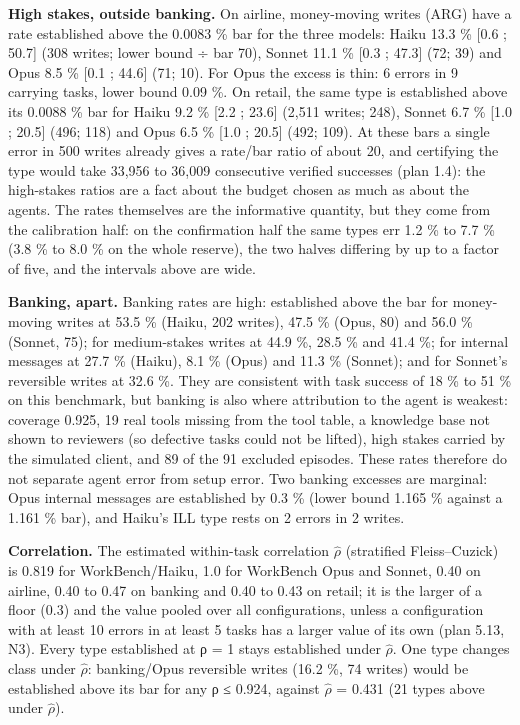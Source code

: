 \textbf{High stakes, outside banking.} On airline, money-moving writes (ARG) have a rate established above the 0.0083 \% bar for the three models: Haiku 13.3 \% {[}0.6 ; 50.7{]} (308 writes; lower bound ÷ bar 70), Sonnet 11.1 \% {[}0.3 ; 47.3{]} (72; 39) and Opus 8.5 \% {[}0.1 ; 44.6{]} (71; 10). For Opus the excess is thin: 6 errors in 9 carrying tasks, lower bound 0.09 \%. On retail, the same type is established above its 0.0088 \% bar for Haiku 9.2 \% {[}2.2 ; 23.6{]} (2,511 writes; 248), Sonnet 6.7 \% {[}1.0 ; 20.5{]} (496; 118) and Opus 6.5 \% {[}1.0 ; 20.5{]} (492; 109). At these bars a single error in 500 writes already gives a rate/bar ratio of about 20, and certifying the type would take 33,956 to 36,009 consecutive verified successes (plan 1.4): the high-stakes ratios are a fact about the budget chosen as much as about the agents. The rates themselves are the informative quantity, but they come from the calibration half: on the confirmation half the same types err 1.2 \% to 7.7 \% (3.8 \% to 8.0 \% on the whole reserve), the two halves differing by up to a factor of five, and the intervals above are wide.

\textbf{Banking, apart.} Banking rates are high: established above the bar for money-moving writes at 53.5 \% (Haiku, 202 writes), 47.5 \% (Opus, 80) and 56.0 \% (Sonnet, 75); for medium-stakes writes at 44.9 \%, 28.5 \% and 41.4 \%; for internal messages at 27.7 \% (Haiku), 8.1 \% (Opus) and 11.3 \% (Sonnet); and for Sonnet's reversible writes at 32.6 \%. They are consistent with task success of 18 \% to 51 \% on this benchmark, but banking is also where attribution to the agent is weakest: coverage 0.925, 19 real tools missing from the tool table, a knowledge base not shown to reviewers (so defective tasks could not be lifted), high stakes carried by the simulated client, and 89 of the 91 excluded episodes. These rates therefore do not separate agent error from setup error. Two banking excesses are marginal: Opus internal messages are established by 0.3 \% (lower bound 1.165 \% against a 1.161 \% bar), and Haiku's ILL type rests on 2 errors in 2 writes.

\textbf{Correlation.} The estimated within-task correlation \ensuremath{\hat{\rho}} (stratified Fleiss--Cuzick) is 0.819 for WorkBench/Haiku, 1.0 for WorkBench Opus and Sonnet, 0.40 on airline, 0.40 to 0.47 on banking and 0.40 to 0.43 on retail; it is the larger of a floor (0.3) and the value pooled over all configurations, unless a configuration with at least 10 errors in at least 5 tasks has a larger value of its own (plan 5.13, N3). Every type established at ρ = 1 stays established under \ensuremath{\hat{\rho}}. One type changes class under \ensuremath{\hat{\rho}}: banking/Opus reversible writes (16.2 \%, 74 writes) would be established above its bar for any ρ ≤ 0.924, against \ensuremath{\hat{\rho}} = 0.431 (21 types above under \ensuremath{\hat{\rho}}).

